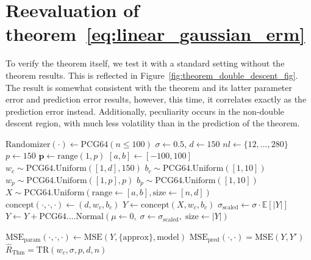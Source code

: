 \section{Reevaluation of theorem~\ref{eq:linear_gaussian_erm}}

To verify the theorem itself, we test it with a standard setting without the theorem results. This is reflected in Figure~\ref{fig:theorem_double_descent_fig}. The result is somewhat consistent with the theorem and its latter parameter error and prediction error results, however, this time, it correlates exactly as the prediction error instead. Additionally, peculiarity occurs in the non-double descent region, with much less volatility than in the prediction of the theorem. 

\begin{algorithm}[h!]
    \caption{Linear regression with Gaussian white noise, full control.}
    \Begin
    {\small
    $\mathrm{Randomizer}(\cdot)\gets\mathrm{PCG64}(n\leq 100)$
    $\sigma\gets 0.5$, $d\gets 150$
    $nl\gets\{12,\dots,280\}$
    $p\gets 150$
    $\mathbf{p}\gets \mathrm{range}(1,p)$\; $[a,b]\gets [-100,100]$\;
    $w_{c}\sim \mathrm{PCG64}.\mathrm{Uniform}([1,d],150)$\; $b_{c}\sim \mathrm{PCG64}.\mathrm{Uniform}([1,10])$\;
    $w_{p}\sim \mathrm{PCG64}.\mathrm{Uniform}([1,p],p)$\; $b_{p}\sim \mathrm{PCG64}.\mathrm{Uniform}([1,10])$\;
    $X\sim\mathrm{PCG64}.\mathrm{Uniform}(\mathrm{range}\gets[a,b],\mathrm{size}\gets[n,d])$
    $\mathrm{concept}(\cdot,\cdot,\cdot)\gets (d,w_{c},b_{c})$\;
    $Y \gets \mathrm{concept}(X, w_{c},b_{c})$\;
    $\sigma_{\mathrm{scaled}} \gets \sigma \cdot \mathbb{E}\left[\lvert Y\rvert\right]$\;
    $Y \gets Y + \mathrm{PCG64}.…\mathrm{Normal}\left(\mu\gets 0,\;\sigma\gets \sigma_{\mathrm{scaled}},\;\mathrm{size}\gets\lvert Y\rvert\right)$ 

    $\mathrm{MSE}_{\mathrm{param}}(\cdot,\cdot,\cdot)\gets \mathrm{MSE}(Y,\{\mathrm{approx}\},\mathrm{model})$\;
    $\mathrm{MSE}_{\mathrm{pred}}(\cdot,\cdot)=\mathrm{MSE}(Y,Y')$
    $\hat{R}_{\mathrm{Thm}}=\mathrm{TR}(w_{c},\sigma,p,d,n)$\;
    }
    \label{algo:algo_reg_lin_1}
\end{algorithm}

